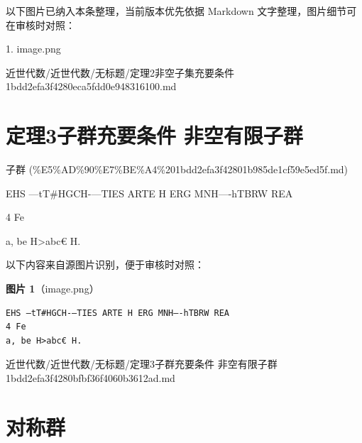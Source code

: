 \begin{note}[关联图片]
以下图片已纳入本条整理，当前版本优先依据 Markdown 文字整理，图片细节可在审核时对照：

1. image.png\\

\end{note}

\begin{note}[来源路径]

近世代数/近世代数/无标题/定理2非空子集充要条件 1bdd2efa3f4280eca5fdd0e948316100.md

\end{note}

\section*{定理3子群充要条件 非空有限子群}

\begin{note}[来源上级主题]

子群 (\%E5\%AD\%90\%E7\%BE\%A4\%201bdd2efa3f42801b985de1cf59e5ed5f.md)

\end{note}

\begin{theorem}

EHS —tT\#HGCH-—TIES ARTE H ERG MNH—-hTBRW REA

4 Fe

a, be H>abc€ H.

\end{theorem}

\begin{note}
以下内容来自源图片识别，便于审核时对照：

\textbf{图片 1}（image.png）
\begin{Verbatim}[fontsize=\small]
EHS —tT#HGCH-—TIES ARTE H ERG MNH—-hTBRW REA
4 Fe
a, be H>abc€ H.
\end{Verbatim}

\end{note}

\begin{note}[来源路径]

近世代数/近世代数/无标题/定理3子群充要条件 非空有限子群 1bdd2efa3f4280bfbf36f4060b3612ad.md

\end{note}

\section*{对称群}

